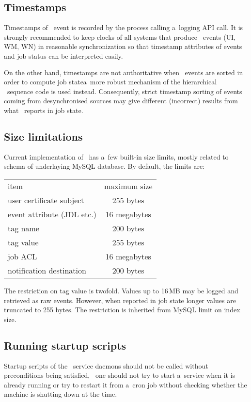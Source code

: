 \subsection{Timestamps}
Timestamps of \LB\ event is recorded by the process calling a~logging API call. It is strongly recommended
to keep clocks of all systems that produce \LB\ events (UI, WM, WN) in reasonable synchronization so that
timestamp attributes of events and job status can be interpreted easily.

On the other hand, timestamps are not authoritative when \LB\ events
are sorted in order to compute job state\Dash a~more robust mechanism
of the hierarchical \LB\ sequence code is used instead. 
Consequently, strict timestamp sorting of events coming from desynchronised
sources may give different (incorrect) results from what \LB\ reports in job
state.

\subsection{Size limitations}

Current implementation of \LB\ has a~few built-in size limits, mostly related
to schema of underlaying MySQL database. By default, the limits are:

\begin{tabular}{lc}
item & maximum size\\
user certificate subject&255 bytes\\
event attribute (JDL etc.) &16 megabytes\\
tag name&200 bytes\\
tag value&255 bytes\\
job ACL&16 megabytes\\
notification destination&200 bytes\\
\end{tabular}

The restriction on tag value is twofold.
Values up to 16\,MB may be logged and retrieved as raw events.
However, when reported in job state longer values are truncated to 255 bytes.
The restriction is inherited from MySQL limit on index size.

\subsection{Running startup scripts}

Startup scripts of the \LB\ service daemons should not be called without preconditions 
being satisfied, \eg\ one should not try to start a~service when it is already running
or try to restart it from a~cron job without checking whether the machine is shutting down
at the time.

